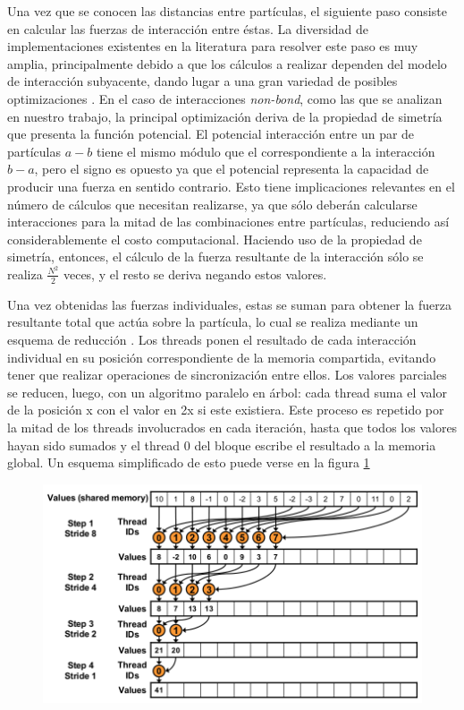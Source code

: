 Una vez que se conocen las distancias entre partículas, el siguiente paso consiste en calcular las fuerzas de interacción entre éstas.
La diversidad de implementaciones existentes en la literatura para resolver este paso es muy amplia, principalmente debido a que los cálculos a realizar dependen del modelo de interacción subyacente, 
dando lugar a una gran variedad de posibles optimizaciones \cite{friedrichs2009accelerating}\cite{gotz2012routine}\cite{salomon2013routine}.
En el caso de interacciones \textit{non-bond}, como las que se analizan en nuestro trabajo, la principal optimización deriva de la propiedad de simetría que presenta la función potencial.
El potencial interacción entre un par de partículas $a-b$ tiene el mismo módulo que el correspondiente a la interacción $b-a$, pero el signo es opuesto ya que el potencial representa la capacidad de producir una fuerza en sentido contrario. 
Esto tiene implicaciones relevantes en el número de cálculos que necesitan realizarse, ya que sólo deberán calcularse interacciones para la mitad de las combinaciones entre partículas, reduciendo así considerablemente el costo computacional.
Haciendo uso de la propiedad de simetría, entonces, el cálculo de la fuerza resultante de la interacción sólo se realiza $\frac{N^2}{2}$ veces, y el resto se deriva negando estos valores.


Una vez obtenidas las fuerzas individuales, estas se suman para obtener la fuerza resultante total que actúa sobre la partícula, lo cual se realiza mediante un esquema de reducción \cite{cudaReductions}. 
Los threads ponen el resultado de cada interacción individual en su posición correspondiente de la memoria compartida, evitando tener que realizar operaciones de sincronización entre ellos. 
Los valores parciales se reducen, luego, con un algoritmo paralelo en árbol: cada thread suma el valor de la posición x con el valor en 2x si este existiera. 
Este proceso es repetido por la mitad de los threads involucrados en cada iteración, hasta que todos los valores hayan sido sumados y el thread 0 del bloque escribe el resultado a la memoria global.
Un esquema simplificado de esto puede verse en la figura \ref{reduction}
\begin{figure}[htbp]
   \centering
   \includegraphics[width=\plotwidth]{img/md/reductions.png}
   \caption{}
   \label{reduction}
\end{figure}

